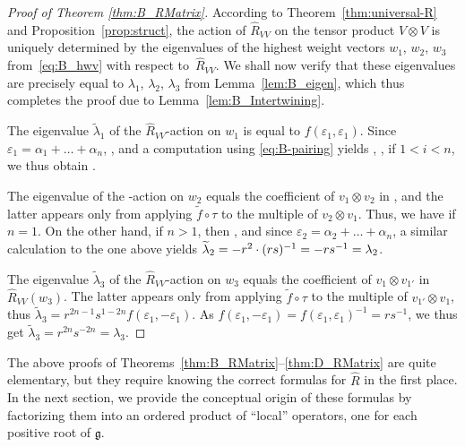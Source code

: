 \documentclass[pdftex]{sigma}
\numberwithin{equation}{section}
\newcommand{\fg}{\mathfrak{g}}
\begin{document}
\begin{proof}[Proof of Theorem \ref{thm:B_RMatrix}]
According to Theorem~\ref{thm:universal-R} and Proposition~\ref{prop:struct}, the action of $\hat{R}_{VV}$ on the tensor product $V\otimes V$ is uniquely determined by the eigenvalues of the highest weight vectors $w_1$, $w_2$, $w_3$ from~\eqref{eq:B_hwv} with respect to~$\hat{R}_{VV}$. We shall now verify that these eigenvalues are precisely equal to $\lambda_1$, $\lambda_2$, $\lambda_3$ from Lemma~\ref{lem:B_eigen}, which thus completes the proof due to Lemma~\ref{lem:B_Intertwining}.

The eigenvalue $\widetilde{\lambda}_1$ of the $\hat{R}_{VV}$-action on $w_1$ is equal to $f(\varepsilon_{1},\varepsilon_{1})$. Since $\varepsilon_1=\alpha_1+\dots+\alpha_n$, , and a computation using \eqref{eq:B-pairing} yields , ,  if $1<i<n$, we thus obtain .


The eigenvalue  of the -action on $w_2$ equals the coefficient of $v_1\otimes v_2$ in , and the latter appears only from applying $\widetilde{f}\circ \tau$ to the multiple of $v_2\otimes v_1$. Thus, we have  if $n = 1$. On the other hand, if $n > 1$, then , and since $\varepsilon_2=\alpha_2+\dots+\alpha_n$, a similar calculation to the one above yields $\smash{\widetilde{\lambda}_2}=-r^2\cdot (rs)^{-1}=-rs^{-1}=\lambda_2$.


The eigenvalue $\widetilde{\lambda}_3$ of the $\hat{R}_{VV}$-action on $w_3$ equals the coefficient of $v_1\otimes v_{1'}$ in $\hat{R}_{VV}(w_3)$. The latter appears only from applying $\widetilde{f}\circ \tau$ to the multiple of $v_{1'}\otimes v_1$, thus $\widetilde{\lambda}_3=r^{2n-1}s^{1-2n} f(\varepsilon_1,-\varepsilon_1)$. As $f(\varepsilon_1,-\varepsilon_1)=f(\varepsilon_1,\varepsilon_1)^{-1}=rs^{-1}$, we thus get $\widetilde{\lambda}_3=r^{2n}s^{-2n}=\lambda_3$.
\end{proof}

\begin{Remark}\label{rem:easy-finite}
The above proofs of Theorems~\ref{thm:B_RMatrix}--\ref{thm:D_RMatrix} are quite elementary, but they require knowing the correct formulas for $\hat{R}$ in the first place. In the next section, we provide the conceptual origin of these formulas by factorizing them into an ordered product of ``local'' operators, one for each positive root of $\fg$.
\end{Remark}
\end{document}
